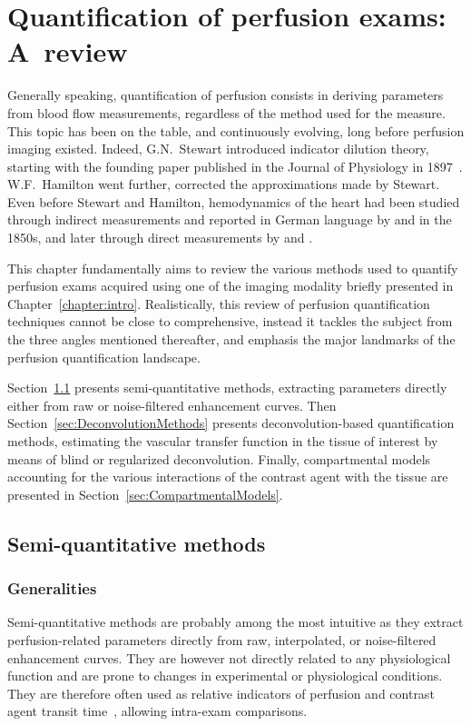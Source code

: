 \chapter{Quantification of perfusion exams: A~review}\label{chapter:review}

Generally speaking, quantification of perfusion consists in deriving parameters from blood flow measurements, regardless of the method used for the measure. 
This topic has been on the table, and continuously evolving, long before perfusion imaging existed. 
Indeed, G.N.~Stewart introduced indicator dilution theory, starting with the founding paper published in the Journal of Physiology in 1897~\cite{Stewart:1897dz}. 
W.F.~Hamilton went further, corrected the approximations made by Stewart.
Even before Stewart and Hamilton, hemodynamics of the heart had been studied  through indirect measurements and reported in German language by \citet{Volkmann:1850us} and \citet{Vierordt:82xUDMVI} in the 1850s, and later through direct measurements by \citet{Stolnikow:1886wm} and \citet{Tigerstedt:1891wn}.

This chapter fundamentally aims to review the various methods used to quantify perfusion exams acquired using one of the imaging modality briefly presented in Chapter~\ref{chapter:intro}. 
Realistically, this review of perfusion quantification techniques cannot be close to comprehensive, instead it tackles the subject from the three angles mentioned thereafter, and emphasis the major landmarks of the perfusion quantification landscape.

Section~\ref{sec:SQMethods} presents semi-quantitative methods, extracting parameters directly either from raw or noise-filtered enhancement curves. 
Then Section~\ref{sec:DeconvolutionMethods} presents deconvolution-based quantification methods, estimating the vascular transfer function in the tissue of interest by means of blind or regularized deconvolution.
Finally, compartmental models accounting for the various interactions of the contrast agent with the tissue are presented in Section~\ref{sec:CompartmentalModels}. 

\section{Semi-quantitative methods}
\label{sec:SQMethods}
\subsection{Generalities}
Semi-quantitative methods are probably among the most intuitive as they extract perfusion-related parameters directly from raw, interpolated, or noise-filtered enhancement curves.
They are however not directly related to any physiological function and are prone to changes in experimental or physiological conditions.
They are therefore often used as relative indicators of perfusion and contrast agent transit time~\cite{Miles:1991et}, allowing intra-exam comparisons.

